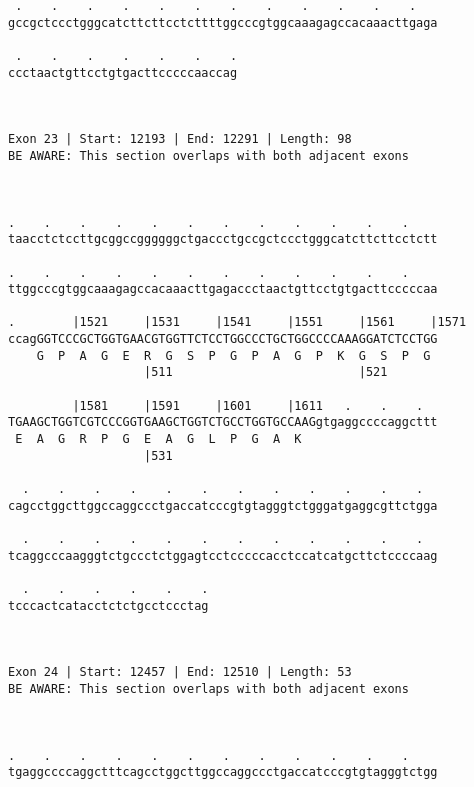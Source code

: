 \documentclass{article}
\begin{document}
\begin{Verbatim}
 .    .    .    .    .    .    .    .    .    .    .    .   
gccgctccctgggcatcttcttcctcttttggcccgtggcaaagagccacaaacttgaga
                                                            
 .    .    .    .    .    .    .
ccctaactgttcctgtgacttcccccaaccag
                                
                                
 
Exon 23 | Start: 12193 | End: 12291 | Length: 98
BE AWARE: This section overlaps with both adjacent exons



.    .    .    .    .    .    .    .    .    .    .    .    
taacctctccttgcggccggggggctgaccctgccgctccctgggcatcttcttcctctt
                                                            
.    .    .    .    .    .    .    .    .    .    .    .    
ttggcccgtggcaaagagccacaaacttgagaccctaactgttcctgtgacttcccccaa
                                                            
.        |1521     |1531     |1541     |1551     |1561     |1571
ccagGGTCCCGCTGGTGAACGTGGTTCTCCTGGCCCTGCTGGCCCCAAAGGATCTCCTGG
    G  P  A  G  E  R  G  S  P  G  P  A  G  P  K  G  S  P  G 
                   |511                          |521       
  
         |1581     |1591     |1601     |1611   .    .    .  
TGAAGCTGGTCGTCCCGGTGAAGCTGGTCTGCCTGGTGCCAAGgtgaggccccaggcttt
 E  A  G  R  P  G  E  A  G  L  P  G  A  K                   
                   |531                                     
  
  .    .    .    .    .    .    .    .    .    .    .    .  
cagcctggcttggccaggccctgaccatcccgtgtagggtctgggatgaggcgttctgga
                                                            
  .    .    .    .    .    .    .    .    .    .    .    .  
tcaggcccaagggtctgccctctggagtcctcccccacctccatcatgcttctccccaag
                                                            
  .    .    .    .    .    .
tcccactcatacctctctgcctccctag
                            
                            
 
Exon 24 | Start: 12457 | End: 12510 | Length: 53
BE AWARE: This section overlaps with both adjacent exons



.    .    .    .    .    .    .    .    .    .    .    .    
tgaggccccaggctttcagcctggcttggccaggccctgaccatcccgtgtagggtctgg
                                                            

\end{Verbatim}
\end{document}
